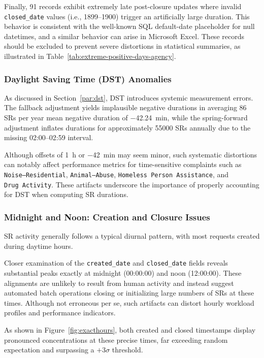 \documentclass[linenumber]{jdsart}
\newcommand{\numint}[1]{\num[round-mode=none]{#1}}
\begin{document}
Finally, 91 records exhibit extremely late post-closure updates where
invalid \texttt{closed\_date} values (i.e., 1899–1900) trigger an artificially large
duration. This behavior is consistent with the well-known SQL default-date
placeholder for null datetimes, and a similar behavior can arise in Microsoft Excel.
These records should be excluded to prevent severe distortions in statistical
summaries, as illustrated in Table~\ref{tab:extreme-positive-days-agency}.

\subsubsection{Daylight Saving Time (DST) Anomalies}
\label{subsubsec:dst}
As discussed in Section~\ref{par:dst}, DST introduces systemic measurement
errors. The fallback adjustment yields implausible negative durations in
averaging \num{86} SRs per year   mean negative duration of \SI{-42.24}{\minute}, 
while the spring-forward adjustment inflates durations for 
approximately \numint{55000} SRs annually due to the missing 02{:}00–02{:}59 interval.

Although offsets of \SI{+1}{\hour} or \SI{-42}{\minute} may seem minor, such
systematic distortions can notably affect performance metrics for
time-sensitive complaints such as \texttt{Noise--Residential},
\texttt{Animal--Abuse}, \texttt{Homeless~Person~Assistance}, and
\texttt{Drug~Activity}. These artifacts underscore the importance of
properly accounting for DST when computing SR durations.

\subsubsection{Midnight and Noon: Creation and Closure Issues}
\label{subsubsec:midnightnoonissues}
SR activity generally follows a typical diurnal pattern, with most requests
created during daytime hours.

Closer examination of the \texttt{created\_date} and \texttt{closed\_date}
fields reveals substantial peaks exactly at midnight (00{:}00{:}00) and noon
(12{:}00{:}00). These alignments are unlikely to result from human activity
and instead suggest automated batch operations closing or initializing large
numbers of SRs at these times. Although not erroneous per se, such artifacts
can distort hourly workload profiles and performance indicators.

As shown in Figure~\ref{fig:exacthours}, both created and closed timestamps
display pronounced concentrations at these precise times, far exceeding random
expectation and surpassing a \(+3\sigma\) threshold.
\end{document}
